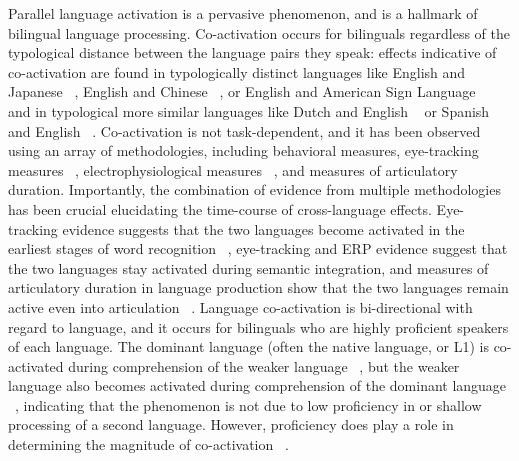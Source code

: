 Parallel language activation is a pervasive phenomenon, and is a hallmark of bilingual language processing. Co-activation occurs for bilinguals regardless of the typological distance between the language pairs they speak: effects indicative of co-activation are found in typologically distinct languages like English and Japanese ~\citep{Hoshino2008}, English and Chinese ~\citep{Thierry2007, Wu2010}, or English and American Sign Language ~\citep{Morford2014} and in typological more similar languages like Dutch and English ~\citep{Duyck2007,VanAssche2010} or Spanish and English ~\citep{Gullifer2013,Schwartz2006}. Co-activation is not task-dependent, and it has been observed using an array of methodologies, including behavioral measures, eye-tracking measures ~\citep[e.g.,][]{Duyck2007, Libben2009}, electrophysiological measures ~\citep{Midgley2011}, and measures of articulatory duration. Importantly, the combination of evidence from multiple methodologies has been crucial elucidating the time-course of cross-language effects. Eye-tracking evidence suggests that the two languages become activated in the earliest stages of word recognition ~\citep[e.g.,][]{Duyck2007}, eye-tracking and ERP evidence suggest that the two languages stay activated during semantic integration, and measures of articulatory duration in language production show that the two languages remain active even into articulation ~\citep{Jacobs2005}. Language co-activation is bi-directional with regard to language, and it occurs for bilinguals who are highly proficient speakers of each language. The dominant language (often the native language, or L1) is co-activated during comprehension of the weaker language ~\citep[often the second language, or L2 e.g.][]{Duyck2007}, but the weaker language also becomes activated during comprehension of the dominant language ~\citep[e.g.,][]{VanHell2002, VanAssche2009}, indicating that the phenomenon is not due to low proficiency in or shallow processing of a second language. However, proficiency does play a role in determining the magnitude of co-activation ~\citep[e.g.,][]{VanHell2002, Pivneva2014}. 

